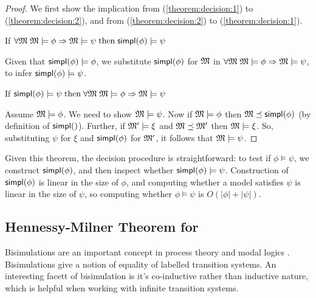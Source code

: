 \begin{proof}
We first show the implication from (\ref{theorem:decision:1}) to
(\ref{theorem:decision:2}), and from (\ref{theorem:decision:2}) to
(\ref{theorem:decision:1}).  \setcounter{mycase}{0}
\begin{mycase}
If $\forall \frak{M} \; \frak{M} \models \phi \Rightarrow \frak{M} \models \psi \; \text{then} \; \mathsf{simpl}(\phi) \models \psi$
\end{mycase}

\NI Given that $\mathsf{simpl}(\phi) \models \phi$, we substitute $\mathsf{simpl}(\phi)$ for $\frak{M} $ in
$\forall \frak{M} \; \frak{M} \models \phi \Rightarrow \frak{M} \models \psi$, to infer $\mathsf{simpl}(\phi)
\models \psi$.

\begin{mycase}
If $\mathsf{simpl}(\phi) \models \psi \; \text{then} \; \forall \frak{M} \; \frak{M} \models \phi \Rightarrow \frak{M} \models \psi$
\end{mycase}

\NI Assume $\frak{M} \models \phi$. We need to show $\frak{M} \models \psi$.  Now if $\frak{M}
\models \phi$ then $\frak{M} \preceq \mathsf{simpl}(\phi)$ (by definition of $\SIMPL$).  Further, if
$\frak{M}' \models \xi $ and $\frak{M} \preceq \frak{M}'$ then $\frak{M} \models \xi $. So, substituting $\psi$
for $\xi $ and $\mathsf{simpl}(\phi)$ for $\frak{M}'$, it follows that $\frak{M} \models \psi$.  
\end{proof}

\NI Given this theorem, the decision procedure is straightforward: to
test if $\phi \models \psi$, we construct $\mathsf{simpl}(\phi)$, and then inspect whether
$\mathsf{simpl}(\phi) \models \psi$.  Construction of $\mathsf{simpl}(\phi)$ is linear in the size of
$\phi$, and computing whether a model satisfies $\psi$ is linear in the size
of $\psi$, so computing whether $\phi \models \psi$ is $O(|\phi|+|\psi|)$.


\subsection{Hennessy-Milner Theorem for \ELABR{}}

Bisimulations are an important concept in process theory and modal
logics \cite{SangiorgiD:intbisac}. Bisimulations give a notion of
equality of labelled transition systems. An interesting facett of
bisimulation is it's co-inductive rather than inductive nature, which
is helpful when working with infinite transition systems.

